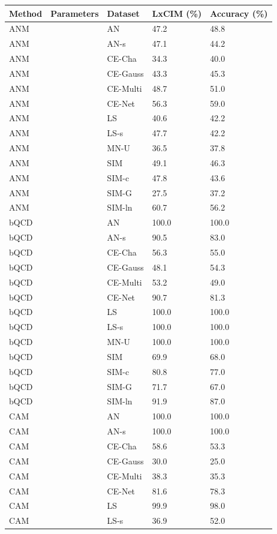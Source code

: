 \begin{tabular}{lllll}
\toprule
Method & Parameters & Dataset & LxCIM (\%) & Accuracy (\%) \\
\midrule
ANM &  & AN & 47.2 & 48.8 \\
ANM &  & AN-s & 47.1 & 44.2 \\
ANM &  & CE-Cha & 34.3 & 40.0 \\
ANM &  & CE-Gauss & 43.3 & 45.3 \\
ANM &  & CE-Multi & 48.7 & 51.0 \\
ANM &  & CE-Net & 56.3 & 59.0 \\
ANM &  & LS & 40.6 & 42.2 \\
ANM &  & LS-s & 47.7 & 42.2 \\
ANM &  & MN-U & 36.5 & 37.8 \\
ANM &  & SIM & 49.1 & 46.3 \\
ANM &  & SIM-c & 47.8 & 43.6 \\
ANM &  & SIM-G & 27.5 & 37.2 \\
ANM &  & SIM-ln & 60.7 & 56.2 \\
bQCD &  & AN & 100.0 & 100.0 \\
bQCD &  & AN-s & 90.5 & 83.0 \\
bQCD &  & CE-Cha & 56.3 & 55.0 \\
bQCD &  & CE-Gauss & 48.1 & 54.3 \\
bQCD &  & CE-Multi & 53.2 & 49.0 \\
bQCD &  & CE-Net & 90.7 & 81.3 \\
bQCD &  & LS & 100.0 & 100.0 \\
bQCD &  & LS-s & 100.0 & 100.0 \\
bQCD &  & MN-U & 100.0 & 100.0 \\
bQCD &  & SIM & 69.9 & 68.0 \\
bQCD &  & SIM-c & 80.8 & 77.0 \\
bQCD &  & SIM-G & 71.7 & 67.0 \\
bQCD &  & SIM-ln & 91.9 & 87.0 \\
CAM &  & AN & 100.0 & 100.0 \\
CAM &  & AN-s & 100.0 & 100.0 \\
CAM &  & CE-Cha & 58.6 & 53.3 \\
CAM &  & CE-Gauss & 30.0 & 25.0 \\
CAM &  & CE-Multi & 38.3 & 35.3 \\
CAM &  & CE-Net & 81.6 & 78.3 \\
CAM &  & LS & 99.9 & 98.0 \\
CAM &  & LS-s & 36.9 & 52.0 \\

\end{tabular}
